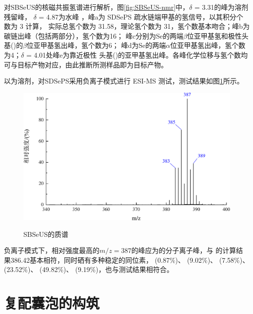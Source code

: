 \documentclass[bachelor,winfonts,replaceperiod]{jnuthesis}
\begin{document}
    对SBSeUS的核磁共振氢谱进行解析，图\ref{fig:SBSeUS-nmr}中，$\delta$ = 3.31的峰为溶剂残留峰，
    $\delta$ = 4.87为水峰\cite{波谱解析} ，峰a为 SDSePS 疏水链端甲基的氢信号，以其积分个数为 3 计算，
    实际总氢个数为 31.58，理论氢个数为 31，氢个数基本吻合；峰b为碳链出峰（包括两部分），氢个数为16；
    峰c分别为Se的两端$\beta$位亚甲基氢和极性头基()的$\beta$位亚甲基氢出峰\cite{aist}，氢个数为6；
    峰d为Se的两端$\alpha$位亚甲基氢出峰\cite{徐辉碧1994,reich1978}，氢个数为4；$\delta$ = 4.01处峰e为靠近极性
    头基()的亚甲基氢出峰。各峰化学位移与氢个数均可与目标产物对应，由此推断所测样品即为目标产物。
    
    以为溶剂，对SDSePS采用负离子模式进行 ESI-MS 测试，测试结果如图\ref{fig:SBSeUS-mass}所示。
    \begin{figure}[htbp]
        \centering
        \includegraphics[width=.7\textwidth]{figure/SBSeUS-mass.pdf}\\
        \caption{SBSeUS的质谱}\label{fig:SBSeUS-mass}
    \end{figure}
    
    负离子模式下，相对强度最高的$m/z = 387$的峰应为的分子离子峰，与
    的计算结果386.42基本相符，同时硒有多种稳定的同位素， (0.87\%)、 (9.02\%)、 (7.58\%)、
     (23.52\%)、 (49.82\%)、 (9.19\%)，也与测试结果相符合。

    \section{复配囊泡的构筑}
\end{document}
